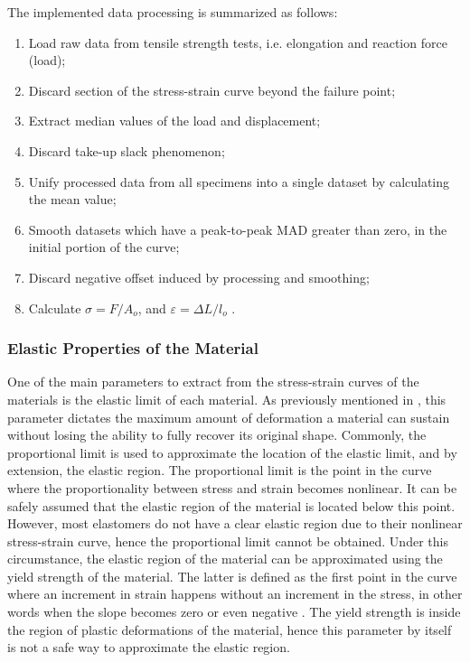 The implemented data processing is summarized as follows:
 \begin{enumerate}[noitemsep] %
    \item Load raw data from tensile strength tests, i.e. elongation and reaction force (load);
    \item Discard section of the stress-strain curve beyond the failure point;
    \item Extract median values of the load and displacement;
    \item Discard take-up slack phenomenon;
    \item Unify processed data from all specimens into a single dataset by calculating the mean value;
    \item Smooth datasets which have a peak-to-peak MAD greater than zero, in the initial portion of the curve;
    \item Discard negative offset induced by processing and smoothing;
    \item Calculate $\sigma = F/A_o$, and $\varepsilon=\Delta L/l_o$ .
\end{enumerate}

\subsubsection{Elastic Properties of the Material}

One of the main parameters to extract from the stress-strain curves of the materials is the elastic limit of each material. As previously mentioned in , this parameter dictates the maximum amount of deformation a material can sustain without losing the ability to fully recover its original shape. Commonly, the proportional limit is used to approximate the location of the elastic limit, and by extension, the elastic region. The proportional limit is the point in the curve where the proportionality between stress and strain becomes nonlinear. It can be safely assumed that the elastic region of the material is located below this point. However, most elastomers do not have a clear elastic region due to their nonlinear stress-strain curve, hence the proportional limit cannot be obtained. Under this circumstance, the elastic region of the material can be approximated using the yield strength of the material. The latter is defined as the first point in the curve where an increment in strain happens without an increment in the stress, in other words when the slope becomes zero or even negative \cite{astmd638}. The yield strength is inside the region of plastic deformations of the material, hence this parameter by itself is not a safe way to approximate the elastic region. 

